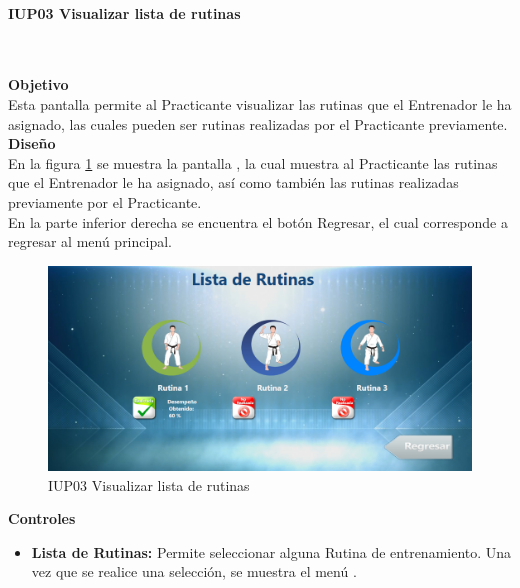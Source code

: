 \paragraph{IUP03 Visualizar lista de rutinas} \hspace{1cm}\\ 
\label{pant:IUP03} 

\textbf{\textcolor[rgb]{0, 0, 0.545098}{Objetivo}}\\
Esta pantalla permite al Practicante visualizar las rutinas que el Entrenador le ha asignado, las cuales pueden ser rutinas realizadas por el Practicante previamente.\\

\textbf{\textcolor[rgb]{0, 0, 0.545098}{Diseño}}\\
En la figura \ref{fig:IUP03} se muestra la pantalla , la cual muestra al Practicante las rutinas que el Entrenador le ha asignado, así como también las rutinas realizadas previamente por el Practicante.\\

En la parte inferior derecha se encuentra el botón Regresar, el cual corresponde a regresar al menú principal.

\begin{figure}[H]
	\centering
		\includegraphics[scale=0.5]{./Figuras/Pantallas/IUP03Visualizar_lista_de_rutinas}
	\caption{IUP03 Visualizar lista de rutinas}
	\label{fig:IUP03}
\end{figure}

\textbf{\textcolor[rgb]{0, 0, 0.545098}{Controles}}
\begin{itemize}
	\item \textbf{\textcolor[rgb]{0, 0, 0.545098}{Lista de Rutinas:}} Permite seleccionar alguna Rutina de entrenamiento. Una vez que se realice una selección, se muestra el menú .
\end{itemize}
\vspace{1em}


